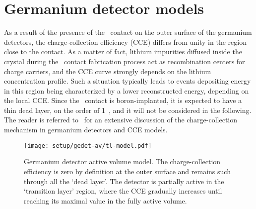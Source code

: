 
\chapter{Germanium detector models}%
\label{apdx:gedetav}

As a result of the presence of the \nplus\ contact on the outer surface of the germanium
detectors, the charge-collection efficiency (CCE) differs from unity in the region close
to the contact. As a matter of fact, lithium impurities diffused inside the crystal during
the \nplus\ contact fabrication process act as recombination centers for charge carriers, and the
CCE curve strongly depends on the lithium concentration profile. Such a situation
typically leads to events depositing energy in this region being characterized by a lower
reconstructed energy, depending on the local CCE. Since the \pplus\ contact is
boron-implanted, it is expected to have a thin dead layer, on the order of 1~\mum, and it
will not be considered in the following. The reader is referred
to~\cite{Lehnert2016} for an extensive discussion of the charge-collection mechanism in
germanium detectors and CCE models.

\begin{figure}
  \centering
  \texttt{[image: setup/gedet-av/tl-model.pdf]}
  \caption{%
    Germanium detector active volume model. The charge-collection efficiency is zero by
    definition at the outer surface and remains such through all the `dead layer'. The
    detector is partially active in the `transition layer' region, where the CCE gradually
    increases until reaching its maximal value in the fully active volume.
  }\label{fig:gedetav:tl-model}
\end{figure}

